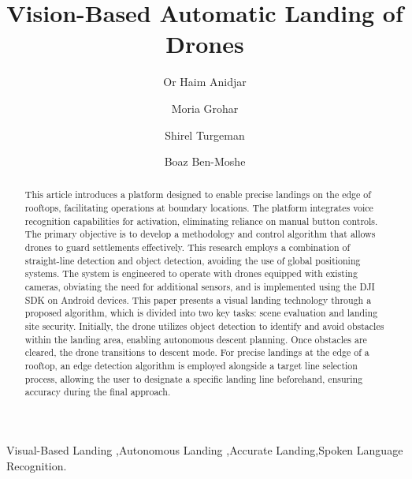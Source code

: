\documentclass[3p,times]{elsarticle}
\begin{document}
\begin{frontmatter}

\title{Vision-Based Automatic Landing of Drones}

\author[a,b,c,d]{Or Haim Anidjar}

\author[a]{Moria Grohar}

\author[a]{Shirel Turgeman}


\author[a, b, c]{Boaz Ben-Moshe}


\address[a]{School of Computer Science, Ariel University, Golan Heights 1, 4077625, Ariel, Israel.}

\address[b]{Ariel Cyber Innovation Center, Ariel University, Golan Heights 1, 4077625, Ariel, Israel.}

\address[c]{Kinematics and Computational Geometry Lab (K\&CG), Ariel University, Golan Heights 1, 4077625, Ariel, Israel.}

\address[d]{Data Science and Artificial Intelligence Research Center, Ariel University, Golan Heights 1, 4077625, Ariel, Israel.}



\begin{abstract}
This article introduces a platform designed to enable precise landings on the edge of rooftops, facilitating operations at boundary locations. The platform integrates voice recognition capabilities for activation, eliminating reliance on manual button controls. The primary objective is to develop a methodology and control algorithm that allows drones to guard settlements effectively. This research employs a combination of straight-line detection and object detection, avoiding the use of global positioning systems. The system is engineered to operate with drones equipped with existing cameras, obviating the need for additional sensors, and is implemented using the DJI SDK on Android devices. This paper presents a visual landing technology through a proposed algorithm, which is divided into two key tasks: scene evaluation and landing site security. Initially, the drone utilizes object detection to identify and avoid obstacles within the landing area, enabling autonomous descent planning. Once obstacles are cleared, the drone transitions to descent mode. For precise landings at the edge of a rooftop, an edge detection algorithm is employed alongside a target line selection process, allowing the user to designate a specific landing line beforehand, ensuring accuracy during the final approach.
\end{abstract}

\begin{keyword}
Visual-Based Landing \sep Autonomous Landing \sep Accurate Landing\sep Spoken Language Recognition.
\end{keyword}

\end{frontmatter}
\end{document}
